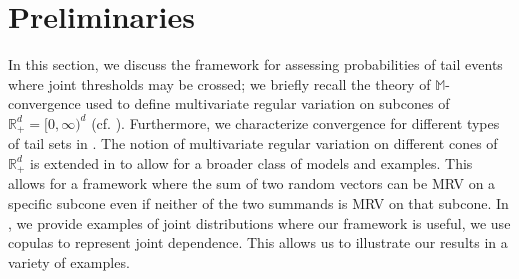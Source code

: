 \documentclass[aos]{imsart}
\numberwithin{equation}{section}
\theoremstyle{plain} %
\theoremstyle{remark}
\newcommand{\M}{\mathbb{M}}
\newcommand{\R}{\mathbb{R}}
\newcommand{\VF}[1]{{\color{blue} #1}}
\newcommand{\DAS}[1]{{\color{red} #1}}
\begin{document}
\section{Preliminaries}\label{sec:prelim}
In this section, we discuss the framework for assessing probabilities of tail events where joint thresholds may be crossed; we briefly recall the theory of $\M$-convergence used to define multivariate regular variation on subcones of $\R_+^d=[0,\infty)^d$ (cf. \citep{lindskog:resnick:roy:2014,das:fasen:kluppelberg:2022}). Furthermore, we characterize convergence for different types of tail sets in . The notion of multivariate regular variation on different cones of $\R_+^d$ is extended in  to allow for a broader class of models and examples. This allows for a framework where the sum of two random vectors can be MRV on a specific subcone even if neither of the two summands is MRV on that subcone. In , we provide examples of joint distributions where our framework is useful, we use copulas to represent joint dependence.  This allows us to illustrate our results in a variety of examples.

\end{document}
